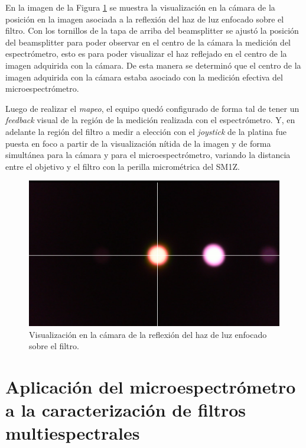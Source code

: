  En la imagen de la Figura \ref{fig:refhazz} se muestra la visualización en la cámara de la posición en la imagen asociada a la reflexión del haz de luz enfocado sobre el filtro. Con los tornillos de la tapa de arriba del beamsplitter se ajustó la posición del beamsplitter para poder observar en el centro de la cámara la medición del espectrómetro, esto es para poder visualizar el haz reflejado en el centro de la imagen adquirida con la cámara. De esta manera se determinó que el centro de la imagen adquirida con la cámara estaba asociado con la medición efectiva del microespectrómetro.

Luego de realizar el \textit{mapeo}, el equipo quedó configurado de forma tal de tener un \textit{feedback} visual de la región de la medición realizada con el espectrómetro. Y, en adelante la región del filtro a medir a elección con el \textit{joystick} de la platina fue puesta en foco a partir de la visualización nítida de la imagen y de forma simultánea para la cámara y para el microespectrómetro, variando la distancia entre el objetivo y el filtro con la perilla micrométrica del SM1Z.

\begin{figure}[H]
	\centering
	\includegraphics[scale=0.25]{Figs/microespectrometro/mapspectrometrocamera.png}
	\caption{Visualización en la cámara de la reflexión del haz de luz enfocado sobre el filtro.}
	\label{fig:refhazz}
\end{figure}



\singlespacing
\section{Aplicación del microespectrómetro a la caracterización de filtros multiespectrales}
\label{sec:resgrales}

